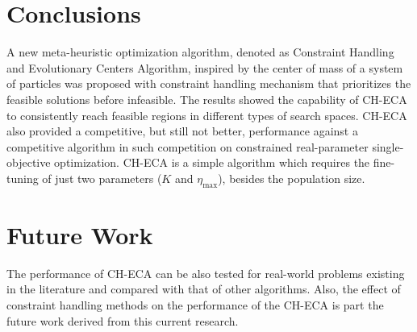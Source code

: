 \documentclass[conference]{IEEEtran}
\begin{document}
\section{Conclusions} %
\label{sec:conclusions}

A new meta-heuristic optimization algorithm, denoted as Constraint Handling and Evolutionary Centers  Algorithm, inspired by the center of mass of a system of particles was proposed with constraint handling mechanism that prioritizes the feasible solutions before infeasible. The results showed the capability of CH-ECA to consistently reach feasible regions  in different types of search spaces. CH-ECA also provided 
a competitive, but still not better, performance against a competitive algorithm in such  competition on constrained real-parameter single-objective optimization. CH-ECA 
is a simple algorithm which requires the fine-tuning of just two parameters ($K$ and $\eta_{\max}$),  besides the population size.%


\section{Future Work} %
\label{sec:future_work}

The performance of CH-ECA can be also tested for real-world problems existing in the literature and compared with that of other algorithms. Also, the effect of constraint handling methods on the performance of the CH-ECA is part the future work derived 
from this current research. 




\end{document}
